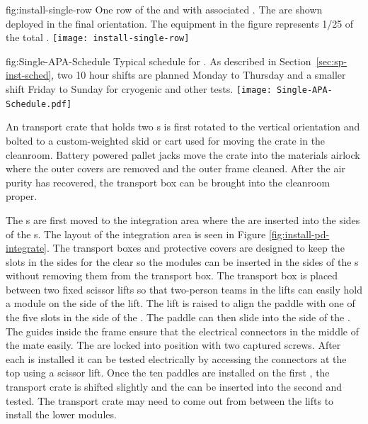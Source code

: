 \begin{dunefigure}{fig:install-single-row}
{One row of the  and  with associated . The  are shown deployed in the final orientation. The equipment in the figure represents 1/25 of the total .}
 \texttt{[image: install-single-row]}
\end{dunefigure}

\begin{dunefigure}
{fig:Single-APA-Schedule}
{Typical  schedule for . As described in Section~\ref{sec:sp-inst-sched}, %
two 10 hour shifts are planned Monday to Thursday and a smaller shift Friday to Sunday for cryogenic and other tests. }
\texttt{[image: Single-APA-Schedule.pdf]}
\end{dunefigure}


  
An  transport crate that holds two s  is first rotated to the vertical orientation and bolted to a custom-weighted skid or cart used for moving the crate in the cleanroom. 
Battery powered pallet jacks move the crate into the materials airlock where the outer covers are removed and the outer frame cleaned. 
After the air purity has recovered, the transport box can be brought into the cleanroom proper. 

The s are first moved to the  integration area where the  are inserted into the sides of the s.
The layout of the  integration area is seen in Figure \ref{fig:install-pd-integrate}.
The  transport boxes and  protective covers are designed to keep the slots in the sides for the  clear so the  modules can be inserted in the sides of the s without removing them from the transport box. 
The  transport box is placed between two fixed scissor lifts so that two-person teams in the lifts can easily hold a  module on the side of the lift. 
The lift is raised to align the paddle with one of the five slots in the side of the . The paddle can then slide into the side of the . 
The guides inside the  frame ensure that the electrical connectors in the middle of the  mate easily. 
The  are locked into position with two captured screws. 
After each  is installed it can be tested electrically by accessing the connectors at the top using a scissor lift. 
Once the ten  paddles are installed on the first , the transport crate is shifted slightly and the  can be inserted into the second  and tested. 
The  transport crate may need to come out from between the lifts to install the lower  modules.

